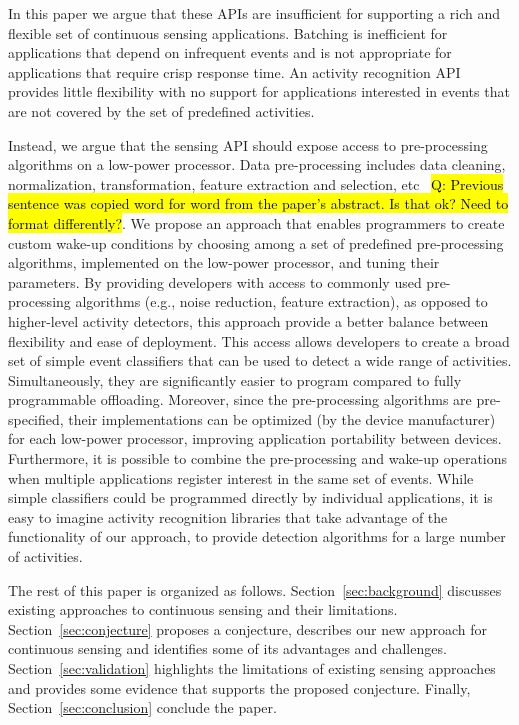 In this paper we argue that these APIs are insufficient for supporting
a rich and flexible set of continuous sensing applications.
Batching is inefficient for applications that depend on infrequent
events and is not appropriate for applications that require crisp
response time.  An activity recognition API provides little
flexibility with no support for applications interested in events that
are not covered by the set of predefined activities.  

Instead, we argue that the sensing API should expose access to
pre-processing algorithms on a low-power processor.  Data pre-processing includes data 
cleaning, normalization, transformation, feature extraction and 
selection, etc~\cite{kotsiantis2006data} \hl{Q: Previous sentence was copied word 
for word from the paper's abstract. Is that ok? Need to format differently?}.  We propose an
approach that enables programmers to create custom wake-up conditions
by choosing among a set of predefined pre-processing algorithms, implemented 
on the low-power processor, and tuning
their parameters.  By providing developers with access to commonly used
pre-processing algorithms (e.g., noise reduction, feature extraction), 
as opposed to higher-level activity detectors, this approach provide a 
better balance between flexibility and ease of
deployment.  This access allows developers to create a broad set of
simple event classifiers that can be used to detect a wide range of
activities.  Simultaneously, they are significantly easier to program
compared to fully programmable offloading.  Moreover, since the
pre-processing algorithms are pre-specified, their implementations can be optimized (by
the device manufacturer) for each low-power processor, improving
application portability between devices.  Furthermore, it is possible
to combine the pre-processing and wake-up operations when multiple applications
register interest in the same set of events.  While simple classifiers could
be programmed directly by individual applications, it is easy to
imagine activity recognition libraries that take advantage of the
functionality of our approach, to provide detection algorithms
for a large number of activities.

The rest of this paper is organized as follows.
Section~\ref{sec:background} discusses existing approaches to
continuous sensing and their limitations.  Section~\ref{sec:conjecture}
proposes a conjecture, describes our new approach for continuous sensing and identifies
some of its advantages and challenges.  Section~\ref{sec:validation} highlights the
limitations of existing sensing approaches and provides
some evidence that supports the proposed conjecture.  Finally, Section~\ref{sec:conclusion} 
conclude the paper.

